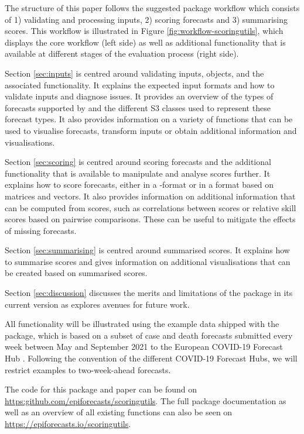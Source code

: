 \documentclass[
]{jss}
\begin{document}
The structure of this paper follows the suggested package workflow which
consists of 1) validating and processing inputs, 2) scoring forecasts
and 3) summarising scores. This workflow is illustrated in Figure
\ref{fig:workflow-scoringutils}, which displays the core workflow (left
side) as well as additional functionality that is available at different
stages of the evaluation process (right side).

Section \ref{sec:inputs} is centred around validating inputs,
 objects, and the associated functionality. It explains
the expected input formats and how to validate inputs and diagnose
issues. It provides an overview of the types of forecasts supported by
 and the different S3 classes used to represent these
forecast types. It also provides information on a variety of functions
that can be used to visualise forecasts, transform inputs or obtain
additional information and visualisations.

Section \ref{sec:scoring} is centred around scoring forecasts and the
additional functionality that is available to manipulate and analyse
scores further. It explains how to score forecasts, either in a
-format or in a format based on matrices and vectors.
It also provides information on additional information that can be
computed from scores, such as correlations between scores or relative
skill scores based on pairwise comparisons. These can be useful to
mitigate the effects of missing forecasts.

Section \ref{sec:summarising} is centred around summarised scores. It
explains how to summarise scores and gives information on additional
visualisations that can be created based on summarised scores.

Section \ref{sec:discussion} discusses the merits and limitations of the
package in its current version as explores avenues for future work.

All functionality will be illustrated using the example data shipped
with the package, which is based on a subset of case and death forecasts
submitted every week between May and September 2021 to the European
COVID-19 Forecast Hub
\citep{sherrattPredictivePerformanceMultimodel2022}. Following the
convention of the different COVID-19 Forecast Hubs, we will restrict
examples to two-week-ahead forecasts.

The code for this package and paper can be found on
\url{https:github.com/epiforecasts/scoringutils}. The full package
documentation as well as an overview of all existing functions can also
be seen on \url{https://epiforecasts.io/scoringutils}.
\end{document}
